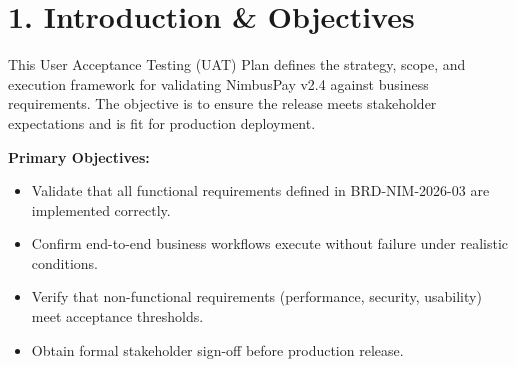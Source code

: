 \section*{\color{primaryNavy}1. Introduction \& Objectives}
\sectionline

This User Acceptance Testing (UAT) Plan defines the strategy, scope, and execution framework for validating NimbusPay v2.4 against business requirements. The objective is to ensure the release meets stakeholder expectations and is fit for production deployment.

\vspace{6pt}

\begin{tcolorbox}[
  enhanced,
  colback=bgLight,
  colframe=accentBlue,
  boxrule=0.8pt,
  left=12pt,
  right=12pt,
  top=8pt,
  bottom=8pt,
  sharp corners,
  before skip=6pt,
  after skip=6pt
]
  \textbf{Primary Objectives:}
  \begin{itemize}[nosep, leftmargin=*]
    \item Validate that all functional requirements defined in BRD-NIM-2026-03 are implemented correctly.
    \item Confirm end-to-end business workflows execute without failure under realistic conditions.
    \item Verify that non-functional requirements (performance, security, usability) meet acceptance thresholds.
    \item Obtain formal stakeholder sign-off before production release.
  \end{itemize}
\end{tcolorbox}
